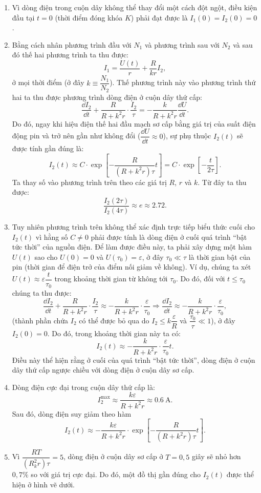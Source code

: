 \begin{loigiai}
\begin{enumerate}[1)]
\item Vì dòng điện trong cuộn dây không thể thay đổi một cách đột ngột, điều kiện đầu tại $t=0$ (thời điểm đóng khóa $K$) phải đạt được là $I_1(0)=I_2(0)=0$.
\item Bằng cách nhân phương trình đầu với $N_1$ và phương trình sau với $N_2$ và sau đó thế hai phương trình ta thu được: 
   $$
I_{1}=\dfrac{U(t)}{r}+\dfrac{R}{k r} I_{2},
$$
ở mọi thời điểm (ở đây $k \equiv \dfrac{N_1}{N_2}$). Thế phương trình này vào phương trình thứ hai ta thu được phương trình dòng điện ở cuộn dây thứ cấp:
    $$\dfrac{\dd I_{2}}{\dd t}+\dfrac{R}{R+k^{2} r} \cdot \dfrac{I_{2}}{\tau}=-\dfrac{k}{R+k^{2} r} \dfrac{\dd U}{\dd t}.$$
Do đó, ngay khi hiệu điện thế hai đầu mạch sơ cấp bằng giá trị của suất điện động pin và trở nên gần như không đổi ($\dfrac{\dd U}{\dd t} \approx 0$), sự phụ thuộc $I_2(t)$ sẽ được tính gần đúng là:
    $$I_{2}(t) \approx C \cdot \exp \left[-\dfrac{R}{\left(R+k^{2} r\right) \tau} t\right]=C \cdot \exp \left[-\dfrac{t}{2 \tau}\right].$$
Ta thay số vào phương trình trên theo các giá trị $R$, $r$ và $k$. Từ đây ta thu được:
   $$
\dfrac{I_{2}(2 \tau)}{I_{2}(4 \tau)} \approx e \approx 2.72.$$
\item Tuy nhiên phương trình trên không thể xác định trực tiếp biểu thức cuối cho $I_2(t)$ vì hằng số $C \neq 0$ phải được tính là dòng điện ở cuối quá trình ``bật tức thời'' của nguồn điện. Để làm được điều này, ta phải xây dựng một hàm $U(t)$ sao cho $U(0)=0$ và $U(\tau_0) = \varepsilon$, ở đây $\tau_0 \ll \tau $ là thời gian bật của pin (thời gian để điện trở của điểm nối giảm về không). Ví dụ, chúng ta xét $U(t) \approx \varepsilon \dfrac{t}{\tau_0}$ trong khoảng thời gian từ không tới $\tau_0$. Do đó, đối với $t \leq \tau_0$ chúng ta thu được:
   $$\dfrac{\dd I_{2}}{\dd t}+\dfrac{R}{R+k^{2} r} \cdot \dfrac{I_{2}}{\tau} \approx-\dfrac{k}{R+k^{2} r} \cdot \dfrac{\varepsilon}{\tau_{0}} \Rightarrow \dfrac{\dd I_{2}}{\dd t} \approx-\dfrac{k}{R+k^{2} r} \cdot \dfrac{\varepsilon}{\tau_{0}},$$
(thành phần chứa $I_2$ có thể được bỏ qua do $I_2 \leq k \dfrac{\varepsilon}{R}$ và $\dfrac{\tau_0}{\tau} \ll 1$), ở đây $I_2(0) =0$. Do đó, trong khoảng thời gian này ta có:
   $$I_{2}(t) \approx-\dfrac{k}{R+k^{2} r} \cdot \dfrac{\varepsilon}{\tau_{0}} t.$$
Điều này thể hiện rằng ở cuối của quá trình ``bật tức thời'', dòng điện ở cuộn dây thứ cấp ngược chiều với dòng điện ở cuộn dây sơ cấp.
\item Dòng điện cực đại trong cuộn dây thứ cấp là:
    $$
I_{2}^{\max } \approx \dfrac{k \varepsilon}{R+k^{2} r} \approx 0.6 \mathrm{~A}.
$$
Sau đó, dòng điện suy giảm theo hàm
   $$
I_{2}(t) \approx-\dfrac{k \varepsilon}{R+k^{2} r} \cdot \exp \left[-\dfrac{R}{\left(R+k^{2} r\right) \tau} t\right].
$$
\item Vì $\dfrac{RT}{(R_k^2 r)\tau} =5 $, dòng điện ở cuộn dây sơ cấp ở $T=0,5$ giây sẽ nhỏ hơn $0,7\% $ so với giá trị cực đại. Do đó, một đồ thị gần đúng cho $I_2(t)$ được thể hiện ở hình vẽ dưới.
  \begin{center}



\end{center}
\end{enumerate}
\end{loigiai}
